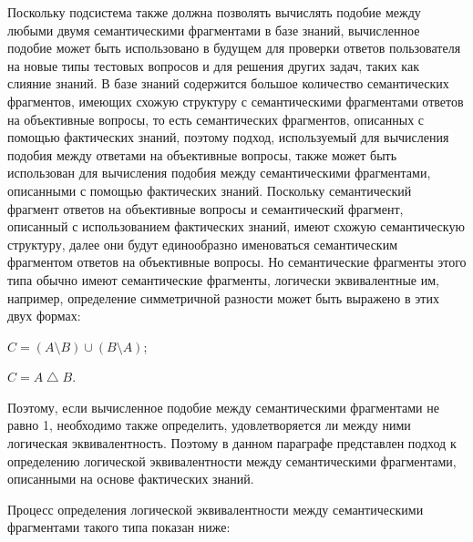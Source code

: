 Поскольку подсистема также должна позволять вычислять подобие между любыми двумя семантическими фрагментами в базе знаний, вычисленное подобие может быть использовано в будущем для проверки ответов пользователя на новые типы тестовых вопросов и для решения других задач, таких как слияние знаний. В базе знаний содержится большое количество семантических фрагментов, имеющих схожую структуру с семантическими фрагментами ответов на объективные вопросы, то есть семантических фрагментов, описанных с помощью фактических знаний, поэтому подход, используемый для вычисления подобия между ответами на объективные вопросы, также может быть использован для вычисления подобия между семантическими фрагментами, описанными с помощью фактических знаний. Поскольку семантический фрагмент ответов на объективные вопросы и семантический фрагмент, описанный с использованием фактических знаний, имеют схожую семантическую структуру, далее они будут единообразно именоваться семантическим фрагментом ответов на объективные вопросы. Но семантические фрагменты этого типа обычно имеют семантические фрагменты, логически эквивалентные им, например, определение симметричной разности может быть выражено в этих двух формах:

\begin{textitemize}
	\item $C= \left ( A\setminus B \right ) \cup \left ( B \setminus A \right )$;
	\item $C= A\bigtriangleup B$.
\end{textitemize}

Поэтому, если вычисленное подобие между семантическими фрагментами не равно 1, необходимо также определить, удовлетворяется ли между ними логическая эквивалентность. Поэтому в данном параграфе представлен подход к определению логической эквивалентности между семантическими фрагментами, описанными на основе фактических знаний.

Процесс определения логической эквивалентности между семантическими фрагментами такого типа показан ниже:

